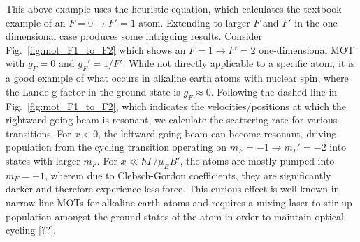 \documentclass[final,5p,times,twocolumn]{elsarticle}
\begin{document}
This above example uses the heuristic equation, which calculates the textbook example of an $F=0\rightarrow F'=1$ atom.  Extending to larger $F$ and $F'$ in the one-dimensional case produces some intriguing results.  Consider Fig.~\ref{fig:mot_F1_to_F2} which shows an $F=1\rightarrow F'=2$ one-dimensional MOT with $g_F=0$ and $g_F'=1/F'$.  While not directly applicable to a specific atom, it is a good example of what occurs in alkaline earth atoms with nuclear spin, where the Lande g-factor in the ground state is $g_F\approx 0$.  Following the dashed line in Fig.~\ref{fig:mot_F1_to_F2}, which indicates the velocities/positions at which the rightward-going beam is resonant, we calculate the scattering rate for various transitions.  For $x<0$, the leftward going beam can become resonant, driving population from the cycling transition operating on $m_F=-1\rightarrow m_F'=-2$ into states with larger $m_F$.  For $x\ll \hbar\Gamma/\mu_B B'$, the atoms are mostly pumped into $m_F=+1$, wherem due to Clebsch-Gordon coefficients, they are significantly darker and therefore experience less force.  This curious effect is well known in narrow-line MOTs for alkaline earth atoms and requires a mixing laser to stir up population amongst the ground states of the atom in order to maintain optical cycling [??].
\end{document}
